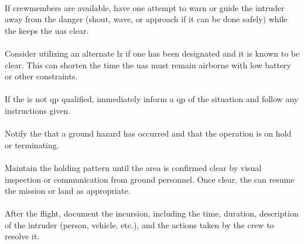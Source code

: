                 \paragraph{} If crewmembers are available, have one attempt to warn or guide the intruder away from the danger (shout, wave, or approach if it can be done safely) while the  keeps the \ac{uas} clear.
                \paragraph{} Consider utilizing an alternate \ac{lz} if one has been designated and it is known to be clear. This can shorten the time the \ac{uas} must remain airborne with low battery or other constraints.
                \paragraph{} If the  is not \ac{qp} qualified, immediately inform a \ac{qp} of the situation and follow any instructions given.
                \paragraph{} Notify the  that a ground hazard has occurred and that the operation is on hold or terminating.
                \paragraph{} Maintain the holding pattern until the area is confirmed clear by visual inspection or communication from ground personnel. Once clear, the  can resume the mission or land as appropriate.
                \paragraph{} After the flight, document the incursion, including the time, duration, description of the intruder (person, vehicle, etc.), and the actions taken by the crew to resolve it.
            
